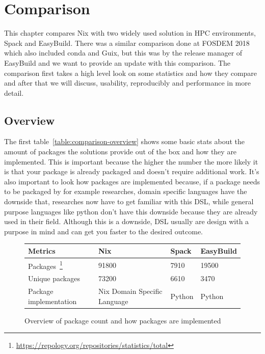 \documentclass{eceasst}
\begin{document}
\section{Comparison}

This chapter compares Nix with two widely used solution in HPC environments, Spack and EasyBuild.
There was a similar comparison done at FOSDEM 2018~\cite{comparision-fosdem} which also included conda and Guix, but this was by the release manager of EasyBuild and we want to provide an update with this comparison.
The comparison first takes a high level look on some statistics and how they compare and after that we will discuss, usability, reproducibly and performance in more detail.

\subsection{Overview}

The first table~\ref{table:comparison-overview} shows some basic stats about the amount of packages the solutions provide out of the box and how they are implemented.
This is important because the higher the number the more likely it is that your package is already packaged and doesn't require additional work.
It's also important to look how packages are implemented because, if a package needs to be packaged by for example researches, domain specific languages have the downside that, researches now have to get familiar with this DSL, while general purpose languages like python don't have this downside because they are already used in their field.
Although this is a downside, DSL usually are design with a purpose in mind and can get you faster to the desired outcome.

\begin{figure}
  \normalsize
  \caption{Overview of package count and how packages are implemented}
  \label{table:comparison-overview}
  \centering
  \begin{tabular}{|p{2cm}|p{3.5cm}|p{3.5cm}|p{3.5cm}|}
    \hline
    \textbf{Metrics} & \textbf{Nix} & \textbf{Spack} & \textbf{EasyBuild} \\ \hline
    Packages~\footnote{\label{foot:repology}\url{https://repology.org/repositories/statistics/total}} & 91800 & 7910 & 19500 \\ \hline
    Unique packages & 73200 & 6610 & 3470 \\ \hline
    Package implementation & Nix Domain Specific Language & Python & Python \\ \hline
  \end{tabular}
\end{figure}
\end{document}
